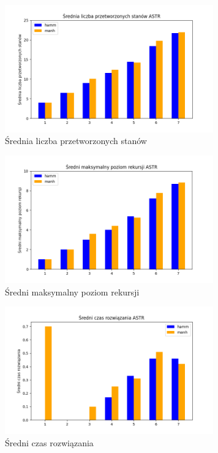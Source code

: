 \documentclass{classrep}
\begin{document}
{        \begin{figure}[!htbp]
            \centering
            \includegraphics[width=\textwidth, height=55mm]{wykresy/astr3.png}
            \caption{Średnia liczba przetworzonych stanów}
        \end{figure}

        \begin{figure}[!htbp]
            \centering
            \includegraphics[width=\textwidth, height=55mm]{wykresy/astr4.png}
            \caption{Średni maksymalny poziom rekursji}
        \end{figure}

        \begin{figure}[!htbp]
            \centering
            \includegraphics[width=\textwidth, height=55mm]{wykresy/astr5.png}
            \caption{Średni czas rozwiązania}
        \end{figure}
        \FloatBarrier
    }
\end{document}
